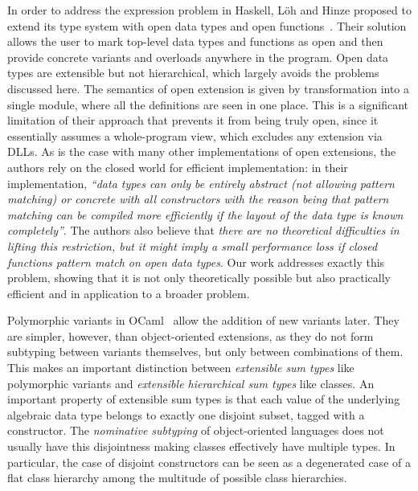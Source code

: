 \documentclass[preprint]{sigplanconf}
\begin{document}
In order to address the expression problem in Haskell, L\"{o}h and Hinze proposed to 
extend its type system with open data types and open functions~\cite{LohHinze2006}.
Their solution allows the user to mark top-level data types and functions as 
open and then provide concrete variants and overloads anywhere in the program. 
Open data types are extensible but not hierarchical, which largely avoids the 
problems discussed here. The semantics of open extension is given by 
transformation into a single module, where all the definitions are seen in one 
place. This is a significant limitation of their approach that prevents it from 
being truly open, since it essentially assumes a whole-program view, which 
excludes any extension via DLLs. As is the case with many other implementations 
of open extensions, the authors rely on the closed world for efficient 
implementation: in their implementation, \emph{``data types can only be entirely 
abstract (not allowing pattern matching) or concrete with all constructors with 
the reason being that pattern matching can be compiled more efficiently if the 
layout of the data type is known completely''}. The authors also believe that 
\emph{there are no theoretical difficulties in lifting this restriction, but it 
might imply a small performance loss if closed functions pattern match on open 
data types}. Our work addresses exactly this problem, showing that it is not 
only theoretically possible but also practically efficient and in application to 
a broader problem.

Polymorphic variants in OCaml~\cite{garrigue-98} allow the addition of new variants 
later. They are simpler, however, than object-oriented extensions, as they do not 
form subtyping between variants themselves, but only between combinations of them. 
This makes an important distinction between \emph{extensible sum types} like 
polymorphic variants and \emph{extensible hierarchical sum types} like classes.
An important property of extensible sum types is that each value of the 
underlying algebraic data type belongs to exactly one disjoint subset, tagged with 
a constructor. The \emph{nominative subtyping} of object-oriented languages does 
not usually have this disjointness making classes effectively have multiple 
types. In particular, the case of disjoint constructors can be seen as a 
degenerated case of a flat class hierarchy among the multitude of possible class 
hierarchies.
\end{document}

